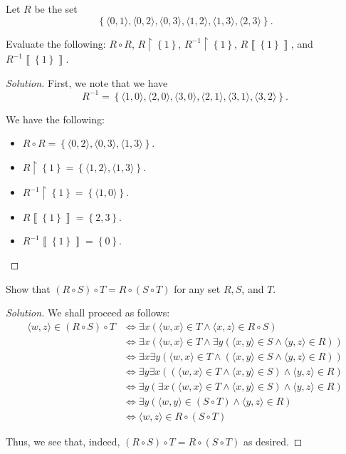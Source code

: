 \documentclass{article}
\newenvironment{solution}{\begin{proof}[Solution]}{\end{proof}}
\newcommand{\image}[1]{\left\llbracket {#1} \right\rrbracket}
\newcommand{\brc}[1]{ \left\{  {#1} \right\}}
\newcommand{\ang}[1]{\langle {#1} \rangle}
\begin{document}
	\begin{hw}{18}
		Let $R$ be the set
		\begin{equation*}
			\brc{\ang{0,1}, \ang{0,2}, \ang{0,3}, \ang{1,2}, \ang{1,3}, \ang{2,3}}.
		\end{equation*}
	
		Evaluate the following: $R \circ R$, $R \restriction \brc{1}$, $R^{-1} \restriction \brc{1}$, $R\image{\brc{1}}$, and $R^{-1}\image{ \brc{1}}$.
	\end{hw}
	\begin{solution}
		First, we note that we have
		\begin{equation*}
			R^{-1} = \brc{\ang{1,0}, \ang{2,0}, \ang{3,0}, \ang{2,1}, \ang{3,1}, \ang{3,2}}.
		\end{equation*}
		
		We have the following:
		\begin{itemize}
			\item $R \circ R = \brc{\ang{0,2}, \ang{0,3}, \ang{1,3}}$.
			\item $R \restriction \brc{1} = \brc{\ang{1,2}, \ang{1,3}}$.
			\item $R^{-1} \restriction \brc{1} = \brc{\ang{1,0}}$.
			\item $R\image{ \brc{1}} = \brc{2,3}$.
			\item $R^{-1}\image{ \brc{1}} = \brc{0}$.
		\end{itemize}
	\end{solution}

	\begin{hw}{21}
		Show that $(R \circ S) \circ T = R \circ (S \circ T)$ for any set $R, S$, and $T$.
	\end{hw}
	\begin{solution}
		We shall proceed as follows:
		\begin{align*}
			\ang{w,z} \in (R \circ S) \circ T &\iff \exists x(\ang{w,x} \in T \land \ang{x,z} \in R \circ S) \\
			&\iff \exists x( \ang{w,x} \in T \land \exists y (\ang{x,y} \in S \land \ang{y,z} \in R)) \\
			&\iff \exists x\exists y( \ang{w,x} \in T \land (\ang{x,y} \in S \land \ang{y,z} \in R)) \\
			&\iff \exists y\exists x( (\ang{w,x} \in T \land \ang{x,y} \in S) \land \ang{y,z} \in R) \\
			&\iff \exists y (\exists x(\ang{w,x} \in T \land \ang{x,y} \in S) \land \ang{y,z} \in R) \\
			&\iff \exists y (\ang{w,y} \in (S \circ T) \land \ang{y,z} \in R) \\
			&\iff \ang{w,z} \in R \circ (S \circ T) 
		\end{align*}
	
		Thus, we see that, indeed, $(R \circ S) \circ T = R \circ (S \circ T)$ as desired.
	\end{solution}
	
\end{document}

